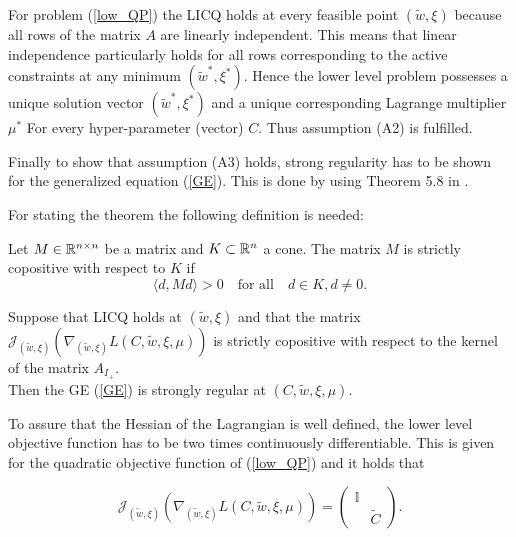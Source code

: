 For problem (\ref{low_QP}) the LICQ holds at every feasible point \((\tilde{w},\xi)\) because all rows of the matrix \(A\) are linearly independent. This means that linear independence particularly holds for all rows corresponding to the active constraints at any minimum \((\tilde{w}^*,\xi^*)\).
Hence the lower level problem possesses a unique solution vector \((\tilde{w}^*,\xi^*)\) and a unique corresponding Lagrange multiplier \(\mu^*\) For every hyper-parameter (vector) \(C\). Thus assumption (A2) is fulfilled.


Finally to show that assumption (A3) holds, strong regularity has to be shown for the generalized equation (\ref{GE}).
This is done by using Theorem 5.8 in \cite[p. 96]{Outrata1998}.

For stating the theorem the following definition is needed:
\begin{definition}
	Let \(M \in \mathbb{R}^{n\times n}\) be a matrix and \(K \subset \mathbb{R}^n\) a cone. The matrix \(M\) is strictly copositive with respect to \(K\) if 
	\[ \langle d,Md \rangle > 0 \quad \text{for all} \quad d \in K, d\neq 0. \]
\end{definition}

\begin{theorem}
	Suppose that LICQ holds at \((\tilde{w},\xi)\) and that the matrix \(\mathcal{J}_{(\tilde{w},\xi)}\left(\nabla_{(\tilde{w},\xi)}L(C,\tilde{w},\xi,\mu)\right)\) is strictly copositive with respect to the kernel of the matrix \(A_{I_+}\). \\
	Then the GE (\ref{GE}) is strongly regular at \((C,\tilde{w},\xi,\mu)\).
\end{theorem}

To assure that the Hessian of the Lagrangian is well defined, the lower level objective function has to be two times continuously differentiable. This is given for the quadratic objective function of (\ref{low_QP}) and it holds that 

\[\mathcal{J}_{(\tilde{w},\xi)}\left(\nabla_{(\tilde{w},\xi)}L(C,\tilde{w},\xi,\mu)\right) = \begin{pmatrix} \mathbb{I} \\ & \tilde{C}\end{pmatrix}. \] 

